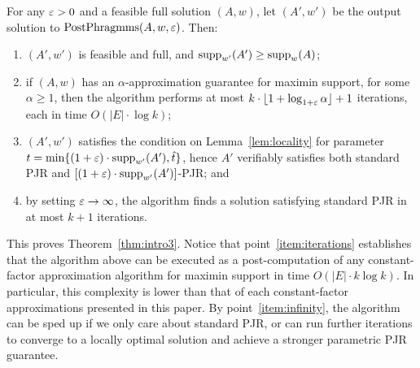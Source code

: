 \begin{theorem}\label{thm:enabler}
For any $\varepsilon>0$ and a feasible full solution $(A,w)$, let $(A',w')$ be the output solution to $\operatorname{PostPhragmms}(A,w,\varepsilon)$. Then: 
\begin{enumerate}
    \item $(A',w')$ is feasible and full, and $\operatorname{supp}_{w'}(A')\geq \operatorname{supp}_w(A)$; \label{item:support}
		\item if $(A,w)$ has an $\alpha$-approximation guarantee for maximin support, for some $\alpha\geq 1$, then the algorithm performs at most $k\cdot \lfloor 1+\log_{1+\varepsilon} \alpha\rfloor +1$ iterations, each in time $O(|E|\cdot \log k)$; \label{item:iterations}
		\item $(A', w')$ satisfies the condition on Lemma~\ref{lem:locality} for parameter $t=\min\{(1+\varepsilon)\cdot \operatorname{supp}_{w'}(A'), \hat{t}\}$, hence $A'$ verifiably satisfies both standard PJR and $[(1+\varepsilon)\cdot \operatorname{supp}_{w'}(A')]$-PJR; and
		\label{item:tPJR}
		\item by setting $\varepsilon\rightarrow\infty$, the algorithm finds a solution satisfying standard PJR in at most $k+1$ iterations. \label{item:infinity}

\end{enumerate}
\end{theorem}

This proves Theorem~\ref{thm:intro3}. 
Notice that point~\ref{item:iterations} establishes that the algorithm above can be executed as a post-computation of any constant-factor approximation algorithm for maximin support in time $O(|E|\cdot k\log k)$. In particular, this complexity is lower than that of each constant-factor approximations presented in this paper.
By point~\ref{item:infinity}, the algorithm can be sped up if we only care about standard PJR, or can run further iterations to converge to a locally optimal solution and achieve a stronger parametric PJR guarantee. 

